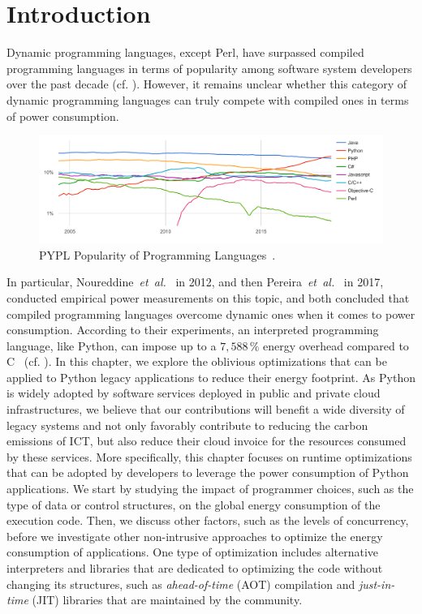 \section{Introduction}
Dynamic programming languages, except Perl, have surpassed compiled programming languages in terms of popularity among software system developers over the past decade (cf. ).
However, it remains unclear whether this category of dynamic programming languages can truly compete with compiled ones in terms of power consumption.

\begin{figure}[htbp]
    \includegraphics[width=\linewidth]{imgs/programminglanguangespopularity.png}
    \caption{PYPL Popularity of Programming Languages~\cite{noauthor_pypl_nodate}.}
    \label{fig:pypl}
\end{figure}

In particular, Noureddine~\emph{et~al.}~\cite{noureddine_preliminary_2012} in 2012, and then Pereira~\emph{et~al.}~\cite{pereira_energy_2017} in 2017, conducted empirical power measurements on this topic, and both concluded that compiled programming languages overcome dynamic ones when it comes to power consumption.
According to their experiments, an interpreted programming language, like Python, can impose up to a $7,588\,\%$ energy overhead compared to C~\cite{pereira_energy_2017} (cf. ).
In this chapter, we explore the oblivious optimizations that can be applied to Python legacy applications to reduce their energy footprint.
As Python is widely adopted by software services deployed in public and private cloud infrastructures, we believe that our contributions will benefit a wide diversity of legacy systems and not only favorably contribute to reducing the carbon emissions of ICT, but also reduce their cloud invoice for the resources consumed by these services.
More specifically, this chapter focuses on runtime optimizations that can be adopted by developers to leverage the power consumption of Python applications.
We start by studying the impact of programmer choices, such as the type of data or control structures, on the global energy consumption of the execution code.
Then, we discuss other factors, such as the levels of concurrency, before we investigate other non-intrusive approaches to optimize the energy consumption of applications.
One type of optimization includes alternative interpreters and libraries that are dedicated to optimizing the code without changing its structures, such as \emph{ahead-of-time} (AOT) compilation and \emph{just-in-time} (JIT) libraries that are maintained by the community.

